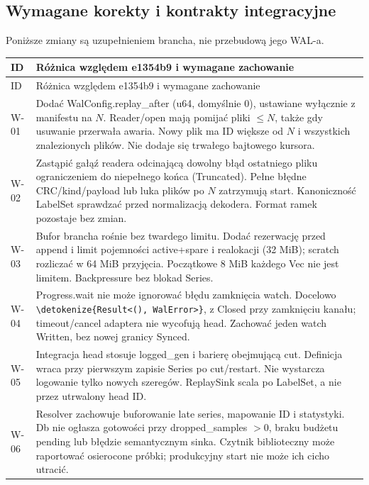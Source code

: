 \documentclass[11pt,a4paper]{article}
\newcommand{\code}[1]{\expandafter\nolinkurl\expandafter{\detokenize{#1}}}
\newcommand{\tabhead}[1]{\toprule #1\\ \midrule\endfirsthead
  \toprule #1\\ \midrule\endhead \bottomrule\endfoot}
\begin{document}
\subsection{Wymagane korekty i kontrakty integracyjne}
\label{sec:wal-corrections}
Poniższe zmiany są uzupełnieniem brancha, nie przebudową jego WAL-a.
\begin{longtable}{P{13mm}P{143mm}}
\tabhead{ID & Różnica względem e1354b9 i wymagane zachowanie}
W-01 & Dodać WalConfig.replay\_after (u64, domyślnie 0),
ustawiane wyłącznie z manifestu na $N$. Reader/open mają
pomijać pliki $\leq N$, także gdy usuwanie przerwała awaria.
Nowy plik ma ID większe od $N$ i wszystkich znalezionych plików.
Nie dodaje się trwałego bajtowego kursora.\\
W-02 & Zastąpić gałąź readera odcinającą dowolny błąd ostatniego pliku
ograniczeniem do niepełnego końca (Truncated).
Pełne błędne CRC/kind/payload lub luka plików po $N$ zatrzymują start.
Kanoniczność LabelSet sprawdzać przed normalizacją dekodera.
Format ramek pozostaje bez zmian.\\
W-03 & Bufor brancha rośnie bez twardego limitu. Dodać rezerwację przed
append i limit pojemności active+spare i realokacji (32 MiB);
scratch rozliczać w 64 MiB przyjęcia. Początkowe 8 MiB każdego Vec
nie jest limitem. Backpressure bez blokad Series.\\
W-04 & Progress.wait nie może ignorować błędu zamknięcia watch.
Docelowo \code{Result<(), WalError>}, z Closed przy zamknięciu kanału;
timeout/cancel adaptera nie wycofują head.
Zachować jeden watch Written, bez nowej granicy Synced.\\
W-05 & Integracja head stosuje logged\_gen i barierę obejmującą cut.
Definicja wraca przy pierwszym zapisie Series po cut/restart.
Nie wystarcza logowanie tylko nowych szeregów.
ReplaySink scala po LabelSet, a nie przez utrwalony head ID.\\
W-06 & Resolver zachowuje buforowanie late series, mapowanie ID
i statystyki. Db nie ogłasza gotowości przy dropped\_samples $>0$,
braku budżetu pending lub błędzie semantycznym sinka.
Czytnik biblioteczny może raportować osierocone próbki; produkcyjny
start nie może ich cicho utracić.\\
\end{longtable}
\end{document}
